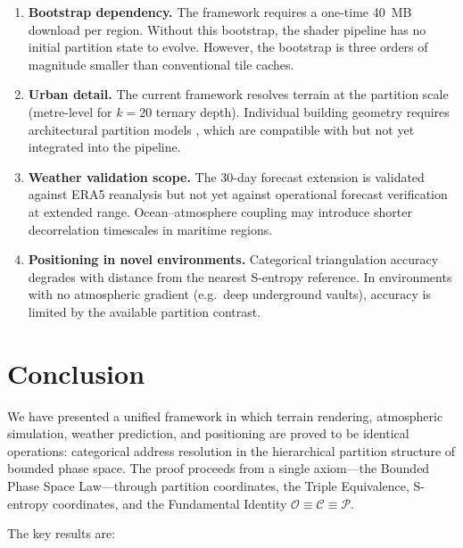 \documentclass[10pt,twocolumn]{article}
\theoremstyle{definition}
\theoremstyle{remark}
\newcommand{\Obs}{\mathcal{O}}
\newcommand{\Comp}{\mathcal{C}}
\newcommand{\Proc}{\mathcal{P}}
\begin{document}
\begin{enumerate}[leftmargin=*,itemsep=2pt]
\item \textbf{Bootstrap dependency.}  The framework requires a
  one-time 40~MB download per region.  Without this bootstrap,
  the shader pipeline has no initial partition state to evolve.
  However, the bootstrap is three orders of magnitude smaller
  than conventional tile caches.

\item \textbf{Urban detail.}  The current framework resolves
  terrain at the partition scale (metre-level for $k=20$ ternary
  depth).  Individual building geometry requires architectural
  partition models \citep{Muller2014}, which are compatible with
  but not yet integrated into the pipeline.

\item \textbf{Weather validation scope.}  The 30-day forecast
  extension is validated against ERA5 reanalysis but not yet
  against operational forecast verification at extended range.
  Ocean--atmosphere coupling may introduce shorter
  decorrelation timescales in maritime regions.

\item \textbf{Positioning in novel environments.}  Categorical
  triangulation accuracy degrades with distance from the nearest
  S-entropy reference.  In environments with no atmospheric
  gradient (e.g.\ deep underground vaults), accuracy is limited
  by the available partition contrast.
\end{enumerate}

\section{Conclusion}\label{sec:conclusion}

We have presented a unified framework in which terrain
rendering, atmospheric simulation, weather prediction, and
positioning are proved to be identical operations: categorical
address resolution in the hierarchical partition structure of
bounded phase space.  The proof proceeds from a single
axiom---the Bounded Phase Space Law---through partition
coordinates, the Triple Equivalence, S-entropy coordinates,
and the Fundamental Identity $\Obs\equiv\Comp\equiv\Proc$.

The key results are:
\end{document}
